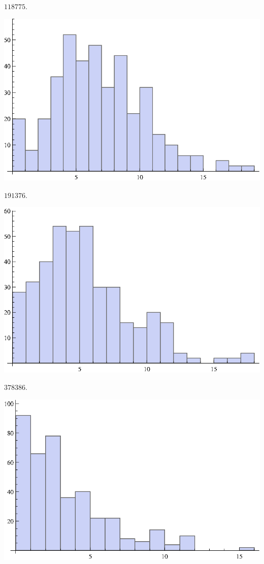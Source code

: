 \documentclass{article}
\begin{document}
\noindent\(118775.\)

\includegraphics{1_gr6.eps}

\noindent\(191376.\)

\includegraphics{1_gr7.eps}

\noindent\(378386.\)

\includegraphics{1_gr8.eps}
\end{document}
